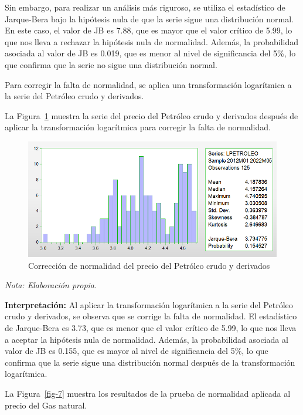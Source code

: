\documentclass[
  letterpaper,
  DIV=11,
  numbers=noendperiod]{scrartcl}
\begin{document}
Sin embargo, para realizar un análisis más riguroso, se utiliza el
estadístico de Jarque-Bera bajo la hipótesis nula de que la serie sigue
una distribución normal. En este caso, el valor de JB es 7.88, que es
mayor que el valor crítico de 5.99, lo que nos lleva a rechazar la
hipótesis nula de normalidad. Además, la probabilidad asociada al valor
de JB es 0.019, que es menor al nivel de significancia del 5\%, lo que
confirma que la serie no sigue una distribución normal.

Para corregir la falta de normalidad, se aplica una transformación
logarítmica a la serie del Petróleo crudo y derivados.

La Figura~\ref{fig-6} muestra la serie del precio del Petróleo crudo y
derivados después de aplicar la transformación logarítmica para corregir
la falta de normalidad.

\begin{figure}

\caption{\label{fig-6}Corrección de normalidad del precio del Petróleo
crudo y derivados}

{\centering \includegraphics{20230603090807.png}

}

\end{figure}

\emph{Nota: Elaboración propia.}

\textbf{Interpretación:} Al aplicar la transformación logarítmica a la
serie del Petróleo crudo y derivados, se observa que se corrige la falta
de normalidad. El estadístico de Jarque-Bera es 3.73, que es menor que
el valor crítico de 5.99, lo que nos lleva a aceptar la hipótesis nula
de normalidad. Además, la probabilidad asociada al valor de JB es 0.155,
que es mayor al nivel de significancia del 5\%, lo que confirma que la
serie sigue una distribución normal después de la transformación
logarítmica.

La Figura~\ref{fig-7} muestra los resultados de la prueba de normalidad
aplicada al precio del Gas natural.
\end{document}
